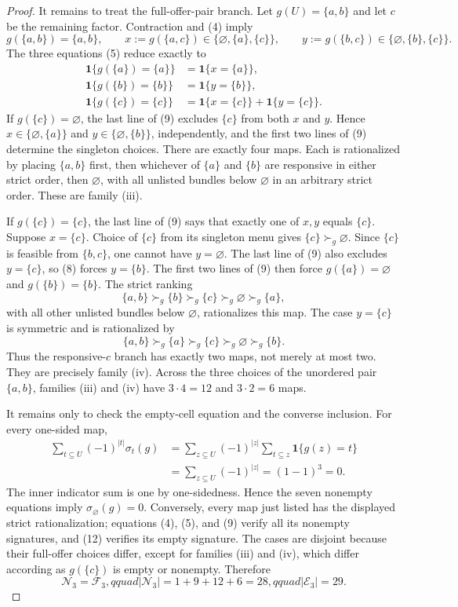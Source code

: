 \documentclass{article}
\begin{document}
\begin{proof}
It remains to treat the full-offer-pair branch.  Let \(g(U)=\{a,b\}\) and let \(c\) be the remaining factor.  Contraction and (4) imply
\[
g(\{a,b\})=\{a,b\},\qquad
x:=g(\{a,c\})\in\{\varnothing,\{a\},\{c\}\},\qquad
y:=g(\{b,c\})\in\{\varnothing,\{b\},\{c\}\}. \tag{8}
\]
The three equations (5) reduce exactly to
\[
\begin{aligned}
\mathbf 1\{g(\{a\})=\{a\}\}&=\mathbf 1\{x=\{a\}\},\\
\mathbf 1\{g(\{b\})=\{b\}\}&=\mathbf 1\{y=\{b\}\},\\
\mathbf 1\{g(\{c\})=\{c\}\}&=\mathbf 1\{x=\{c\}\}+\mathbf 1\{y=\{c\}\}.
\end{aligned} \tag{9}
\]
If \(g(\{c\})=\varnothing\), the last line of (9) excludes \(\{c\}\) from both \(x\) and \(y\).  Hence \(x\in\{\varnothing,\{a\}\}\) and \(y\in\{\varnothing,\{b\}\}\), independently, and the first two lines of (9) determine the singleton choices.  There are exactly four maps.  Each is rationalized by placing \(\{a,b\}\) first, then whichever of \(\{a\}\) and \(\{b\}\) are responsive in either strict order, then \(\varnothing\), with all unlisted bundles below \(\varnothing\) in an arbitrary strict order.  These are family (iii).

If \(g(\{c\})=\{c\}\), the last line of (9) says that exactly one of \(x,y\) equals \(\{c\}\).  Suppose \(x=\{c\}\).  Choice of \(\{c\}\) from its singleton menu gives \(\{c\}\succ_g\varnothing\).  Since \(\{c\}\) is feasible from \(\{b,c\}\), one cannot have \(y=\varnothing\).  The last line of (9) also excludes \(y=\{c\}\), so (8) forces \(y=\{b\}\).  The first two lines of (9) then force \(g(\{a\})=\varnothing\) and \(g(\{b\})=\{b\}\).  The strict ranking
\[
\{a,b\}\succ_g\{b\}\succ_g\{c\}\succ_g\varnothing\succ_g\{a\}, \tag{10}
\]
with all other unlisted bundles below \(\varnothing\), rationalizes this map.  The case \(y=\{c\}\) is symmetric and is rationalized by
\[
\{a,b\}\succ_g\{a\}\succ_g\{c\}\succ_g\varnothing\succ_g\{b\}. \tag{11}
\]
Thus the responsive-\(c\) branch has exactly two maps, not merely at most two.  They are precisely family (iv).  Across the three choices of the unordered pair \(\{a,b\}\), families (iii) and (iv) have \(3\cdot4=12\) and \(3\cdot2=6\) maps.

It remains only to check the empty-cell equation and the converse inclusion.  For every one-sided map,
\[
\begin{aligned}
\sum_{t\subseteq U}(-1)^{|t|}\sigma_t(g)
&=\sum_{z\subseteq U}(-1)^{|z|}
  \sum_{t\subseteq z}\mathbf 1\{g(z)=t\}\\
&=\sum_{z\subseteq U}(-1)^{|z|}=(1-1)^3=0. 
\end{aligned} \tag{12}
\]
The inner indicator sum is one by one-sidedness.  Hence the seven nonempty equations imply \(\sigma_\varnothing(g)=0\).  Conversely, every map just listed has the displayed strict rationalization; equations (4), (5), and (9) verify all its nonempty signatures, and (12) verifies its empty signature.  The cases are disjoint because their full-offer choices differ, except for families (iii) and (iv), which differ according as \(g(\{c\})\) is empty or nonempty.  Therefore
\[
\mathcal N_3=\mathcal F_3,qquad
|\mathcal N_3|=1+9+12+6=28,qquad
|\mathcal E_3|=29. \tag{13}
\]


\end{proof}
\end{document}

